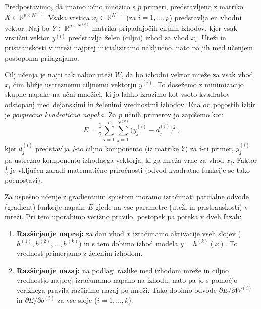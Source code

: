 Predpostavimo, da imamo učno množico s $p$ primeri, predstavljeno z matriko $X \in \mathbb{R}^{p \times N^{(0)}}$. Vsaka vrstica $x_i \in \mathbb{R}^{N^{(0)}}$ (za $i = 1, \dots, p$) predstavlja en vhodni vektor. Naj bo $Y \in \mathbb{R}^{p \times N^{(k)}}$ matrika pripadajočih ciljnih izhodov, kjer vsak vrstični vektor $y^{(i)}$ predstavlja želen (ciljni) izhod za vhod $x_i$. Uteži in pristranskosti v mreži najprej inicializiramo naključno, nato pa jih med učenjem postopoma prilagajamo.

Cilj učenja je najti tak nabor uteži $W$, da bo izhodni vektor mreže za vsak vhod $x_i$ čim bližje ustreznemu ciljnemu vektorju $y^{(i)}$. To dosežemo z minimizacijo skupne napake na učni množici, ki jo lahko izrazimo kot vsoto kvadratov odstopanj med dejanskimi in želenimi vrednostmi izhodov. Ena od pogostih izbir je \textit{povprečna kvadratična napaka}. Za $p$ učnih primerov jo zapišemo kot:
\[
  E = \frac{1}{2} \sum_{i=1}^{p} \sum_{j=1}^{N^{(k)}} \big(y_{j}^{(i)} - d_{j}^{(i)}\big)^2\,,
\] 
kjer $d_{j}^{(i)}$ predstavlja $j$-to ciljno komponento (iz matrike $Y$) za $i$-ti primer, $y_{j}^{(i)}$ pa ustrezno komponento izhodnega vektorja, ki ga mreža vrne za vhod $x_i$. Faktor $\frac{1}{2}$ je vključen zaradi matematične priročnosti (odvod kvadratne funkcije se tako poenostavi).

Za uspešno učenje z gradientnim spustom moramo izračunati parcialne odvode (gradient) funkcije napake $E$ glede na vse parametre (uteži in pristranskosti) v mreži. Pri tem uporabimo verižno pravilo, postopek pa poteka v dveh fazah:
\begin{enumerate}
  \item \textbf{Razširjanje naprej:} za dan vhod $x$ izračunamo aktivacije vseh slojev ($h^{(1)}, h^{(2)}, \dots, h^{(k)}$) in s tem dobimo izhod modela $y = h^{(k)}(x)$. To vrednost primerjamo z želenim izhodom.
  \item \textbf{Razširjanje nazaj:} na podlagi razlike med izhodom mreže in ciljno vrednostjo najprej izračunamo napako na izhodu, nato pa jo s pomočjo verižnega pravila razširimo nazaj po mreži. Tako dobimo odvode $\partial E / \partial W^{(i)}$ in $\partial E / \partial b^{(i)}$ za vse sloje ($i = 1, \dots, k$). 
\end{enumerate}

